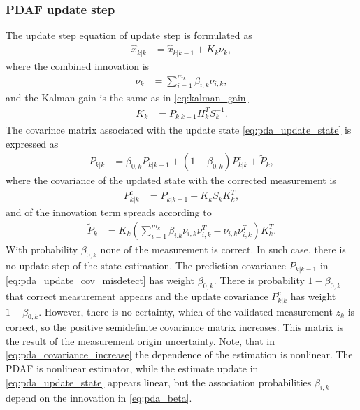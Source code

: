 \subsubsection{PDAF update step}
The update step equation of update step is formulated as
\begin{align}
    \hat{x}_{k|k} &= \hat{x}_{k|k-1} + K_k \nu_k, \label{eq:pda_update_state}
\end{align}
where the combined innovation is
\begin{align}
    \nu_k &= \sum_{i=1}^{m_k} \beta_{i,k} \nu_{i,k},
\end{align}
and the Kalman gain is the same as in \eqref{eq:kalman_gain}
\begin{align}
    K_k &= P_{k|k-1} H_k^T S_k^{-1}.
\end{align}
The covarince matrix associated with the update state \eqref{eq:pda_update_state} is expressed as
\begin{align}
    P_{k|k} &= \beta_{0,k} P_{k|k-1} + (1-\beta_{0,k}) P_{k|k}^c + \tilde{P}_k, \label{eq:pda_update_cov_misdetect}
\end{align}
where the covariance of the updated state with the corrected measurement is
\begin{align}
    P_{k|k}^c &= P_{k|k-1} - K_k S_k K_{k}^T, \label{eq:pda_update_cov_detenct}
\end{align}
and of the innovation term spreads according to
\begin{align}
    \tilde{P}_k &= K_k (\sum_{i=1}^{m_k} \beta_{i.k} \nu_{i,k} \nu_{i,k}^T - \nu_{i,k} \nu_{i,k}^T) K_k^T. \label{eq:pda_covariance_increase}
\end{align}
With probability $\beta_{0,k}$ none of the measurement is correct. In such case, there is no update step of the
state estimation. The prediction covariance $P_{k|k-1}$ in \eqref{eq:pda_update_cov_misdetect} has weight $\beta_{0,k}$. There
is probability $1-\beta_{0,k}$ that correct measurement appears and the update covariance $P_{k|k}^c$ has weight $1-\beta_{0,k}$. However, there is no certainty, which of the validated measurement $z_k$ is correct, so the positive semidefinite covariance matrix increases. This matrix is the result of the measurement origin uncertainty. Note, that in \eqref{eq:pda_covariance_increase} the dependence of the estimation is nonlinear. The PDAF is nonlinear estimator, while the estimate update in \eqref{eq:pda_update_state} appears linear, but the association probabilities $\beta_{i,k}$ depend on the innovation in \eqref{eq:pda_beta}.



